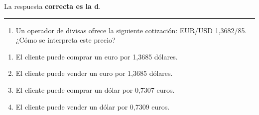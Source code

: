 \documentclass[
  letterpaper,
  DIV=11,
  numbers=noendperiod]{scrreprt}
\providecommand{\tightlist}{%
  \setlength{\itemsep}{0pt}\setlength{\parskip}{0pt}}\usepackage{longtable,booktabs,array}
\begin{document}
\begin{tcolorbox}[enhanced jigsaw, left=2mm, opacityback=0, colback=white, breakable, arc=.35mm, bottomrule=.15mm, rightrule=.15mm, toprule=.15mm, leftrule=.75mm, colframe=quarto-callout-tip-color-frame]
\begin{minipage}[t]{5.5mm}
\textcolor{quarto-callout-tip-color}{\faLightbulb}
\end{minipage}%
\begin{minipage}[t]{\textwidth - 5.5mm}

La respuesta \textbf{correcta es la d}.

\end{minipage}%
\end{tcolorbox}

\begin{center}\rule{0.5\linewidth}{0.5pt}\end{center}

\begin{enumerate}
\def\labelenumi{\arabic{enumi}.}
\setcounter{enumi}{33}
\tightlist
\item
  Un operador de divisas ofrece la siguiente cotización: EUR/USD
  1,3682/85. ¿Cómo se interpreta este precio?
\end{enumerate}

\begin{enumerate}
\def\labelenumi{\alph{enumi}.}
\item
  El cliente puede comprar un euro por 1,3685 dólares.
\item
  El cliente puede vender un euro por 1,3685 dólares.
\item
  El cliente puede comprar un dólar por 0,7307 euros.
\item
  El cliente puede vender un dólar por 0,7309 euros.
\end{enumerate}
\end{document}
